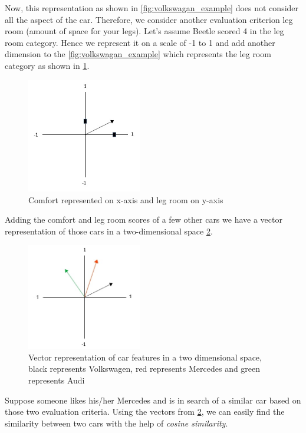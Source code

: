 Now, this representation as shown in \ref{fig:volkswagan_example} does not consider all the aspect of the car. Therefore, we consider another evaluation criterion leg room (amount of space for your legs). Let's assume Beetle scored 4 in the leg room category. Hence we represent it on a scale of -1 to 1 and add another dimension to the \ref{fig:volkswagan_example} which represents the leg room category as shown in \ref{fig:volkswagan_example_2}. 

\begin{figure}
    \centering
    \includegraphics[width=5cm]{pics/wordVec_2.jpg}
    \captionsetup{justification=centering,margin=2cm}
    \caption{Comfort represented on x-axis and leg room on y-axis}
    \label{fig:volkswagan_example_2}
\end{figure}

Adding the comfort and leg room scores of a few other cars we have a vector representation of those cars in a two-dimensional space \ref{fig:wordVecManyCars}.


\begin{figure}[!ht]
    \centering
    \includegraphics[width=5cm]{pics/wordVec_2_manycars.jpg}
    \captionsetup{justification=centering,margin=2cm}
    \caption{Vector representation of car features in a two dimensional space, black represents Volkswagen, red represents Mercedes and green represents Audi}
    \label{fig:wordVecManyCars}
\end{figure}

Suppose someone likes his/her Mercedes and is in search of a similar car based on those two evaluation criteria. Using the vectors from \ref{fig:wordVecManyCars}, we can easily find the similarity between two cars with the help of \textit{cosine similarity}.

